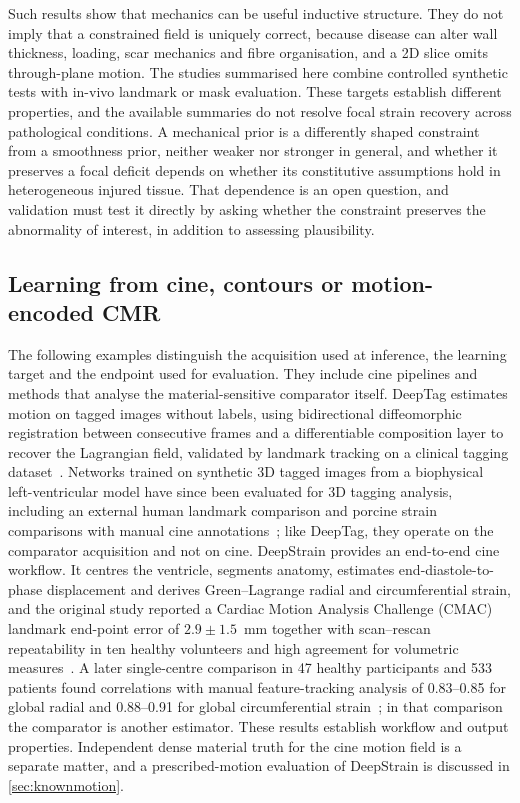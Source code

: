 Such results show that mechanics can be useful inductive structure. They do not imply that a constrained field is uniquely correct, because disease can alter wall thickness, loading, scar mechanics and fibre organisation, and a 2D slice omits through-plane motion. The studies summarised here combine controlled synthetic tests with in-vivo landmark or mask evaluation. These targets establish different properties, and the available summaries do not resolve focal strain recovery across pathological conditions. A mechanical prior is a differently shaped constraint from a smoothness prior, neither weaker nor stronger in general, and whether it preserves a focal deficit depends on whether its constitutive assumptions hold in heterogeneous injured tissue. That dependence is an open question, and validation must test it directly by asking whether the constraint preserves the abnormality of interest, in addition to assessing plausibility.

\subsection{Learning from cine, contours or motion-encoded CMR}\label{sec:supervised}

The following examples distinguish the acquisition used at inference, the learning target and the endpoint used for evaluation. They include cine pipelines and methods that analyse the material-sensitive comparator itself. DeepTag estimates motion on tagged images without labels, using bidirectional diffeomorphic registration between consecutive frames and a differentiable composition layer to recover the Lagrangian field, validated by landmark tracking on a clinical tagging dataset~\cite{ye2021deeptag}. Networks trained on synthetic 3D tagged images from a biophysical left-ventricular model have since been evaluated for 3D tagging analysis, including an external human landmark comparison and porcine strain comparisons with manual cine annotations~\cite{buoso2025tagging3d}; like DeepTag, they operate on the comparator acquisition and not on cine. DeepStrain provides an end-to-end cine workflow. It centres the ventricle, segments anatomy, estimates end-diastole-to-phase displacement and derives Green--Lagrange radial and circumferential strain, and the original study reported a Cardiac Motion Analysis Challenge (CMAC) landmark end-point error of \(2.9\pm1.5\)~mm together with scan--rescan repeatability in ten healthy volunteers and high agreement for volumetric measures~\cite{morales2021}. A later single-centre comparison in 47 healthy participants and 533 patients found correlations with manual feature-tracking analysis of 0.83--0.85 for global radial and 0.88--0.91 for global circumferential strain~\cite{morales2022comparison}; in that comparison the comparator is another estimator. These results establish workflow and output properties. Independent dense material truth for the cine motion field is a separate matter, and a prescribed-motion evaluation of DeepStrain is discussed in \cref{sec:knownmotion}.

